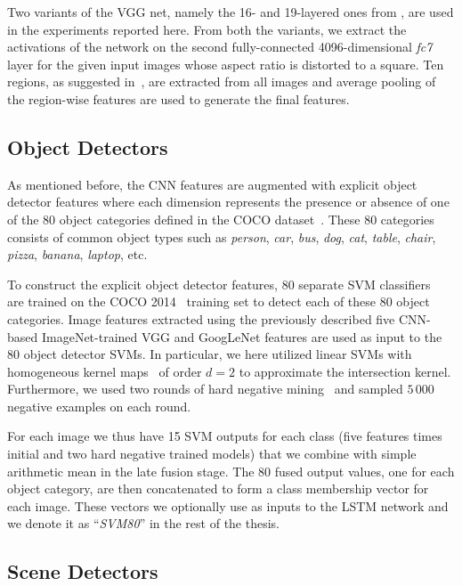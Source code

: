 Two variants of the VGG net, namely the 16- and 19-layered ones from
\cite{Simonyan14c}, are used in the experiments reported here.
From both the variants, we extract the activations of the network on the second
fully-connected 4096-dimensional \emph{fc7} layer for the given input images
whose aspect ratio is distorted to a square.
Ten regions, as suggested in~\cite{Krizhevsky2012}, are extracted from all
images and average pooling of the region-wise features are used to generate the
final features.

\subsection{Object Detectors}
\label{subsec:svm80}

As mentioned before, the CNN features are augmented with explicit object
detector features where each dimension represents the presence or absence of one
of the 80 object categories defined in the COCO dataset~\cite{Lin2014}.
These 80 categories consists of common object types such as \emph{person},
\emph{car}, \emph{bus}, \emph{dog}, \emph{cat}, \emph{table}, \emph{chair},
\emph{pizza}, \emph{banana}, \emph{laptop}, etc.

To construct the explicit object detector features, 80 separate SVM
classifiers~\cite{cortes1995support} are trained on the COCO 2014~\cite{Lin2014}
training set to detect each of these 80 object categories.
Image features extracted using the previously described five CNN-based
ImageNet-trained VGG and GoogLeNet features are used as input to the 80 object
detector SVMs. 
In particular, we here utilized linear SVMs with homogeneous kernel
maps~\cite{Vedaldi2010} of order $d=2$ to approximate the intersection kernel.
Furthermore, we used two rounds of hard negative mining~\cite{Li2013} and
sampled $5\,000$ negative examples on each round.

For each image we thus have 15 SVM outputs for each class (five features times
initial and two hard negative trained models) that we combine with simple
arithmetic mean in the late fusion stage.
The 80 fused output values, one for each object category, are then concatenated
to form a class membership vector for each image.
These vectors we optionally use as inputs to the LSTM network and we denote it
as ``\emph{SVM80}'' in the rest of the thesis.

\subsection{Scene Detectors}

